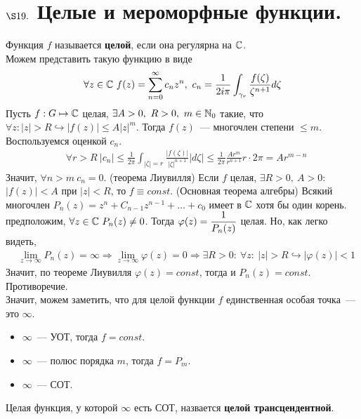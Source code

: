 \section{$\S 19.$ Целые и мероморфные функции.}
\Def
Функция $f$ называется \textbf{целой}, если она регулярна на $\mathbb{C}$.
\\
Можем представить такую функцию в виде
\begin{equation}\label{(19.1)}
    \forall z \in \mathbb{C} \ f(z) = \sum_{n=0}^\infty c_nz^n, \ c_n = \frac{1}{2i\pi}\int_{\gamma_r}\frac{f(\zeta)}{\zeta^{n+1}} d \zeta
\end{equation}
\theorem
Пусть $f:G \mapsto \mathbb{C}$ целая, $\exists A > 0, \ R > 0, \ m \in \mathbb{N}_0$ такие,
что $\forall z: \left| z \right| > R \hookrightarrow \left| f(z) \right| \leq
A\left| z \right|^m$. Тогда $f(z)$~--- многочлен степени $\leq m$.
\pr
Воспользуемся оценкой $c_n$.
\begin{align*}
  & \forall r > R \ \left|c_n \right| \leq \frac{1}{2\pi}\int_{\left| \zeta \right| = r} \frac{\left| f(\zeta) \right|}{\left| \zeta \right|^{n+1}}\left| d\zeta \right|\leq \frac{1}{2\pi}\frac{Ar^m}{r^{n+1}}r\cdot 2 \pi = Ar^{m-n}
\end{align*}
Значит, $\forall n > m \ c_n = 0$.
\corollary (теорема Лиувилля)
Если $f$ целая, $\exists R > 0, \ A > 0$: $\left| f(z) \right|< A$ при $\left| z
\right| < R$, то $f \equiv const$.
\theorem (Основная теорема алгебры)
Всякий многочлен $P_n(z) = z^n + C_{n-1}z^{n-1}+\dots+c_0$ имеет в $\mathbb{C}$ хотя бы
один корень.
\pr
предположим, $\forall z \in \mathbb{C} \ P_n(z) \neq 0$. Тогда $\varphi(z) = \displaystyle
\frac{1}{P_n(z)}$ целая. Но, как легко видеть,
\begin{align*}
  & \lim_{z \to \infty}P_n(z) = \infty \Rightarrow \lim_{z \to \infty} \varphi(z) = 0 \Rightarrow \exists R > 0: \ \forall z: \ \left| z \right| > R \hookrightarrow \left| \varphi(z) \right| < 1
\end{align*}
Значит, по теореме Лиувилля $\varphi(z) = const$, тогда и $P_n(z) = const$.
Противоречие.
\\
Значит, можем заметить, что для целой функции $f$ единственная особая точка~---
это $\infty$.
\begin{itemize}
    \item $\infty$~--- УОТ, тогда $f = const$.
    \item $\infty$~--- полюс порядка $m$, тогда $f = P_m$.
    \item $\infty$~--- СОТ.
\end{itemize}
\Def
Целая функция, у которой $\infty$ есть СОТ, назвается \textbf{целой
  трансцендентной}.
